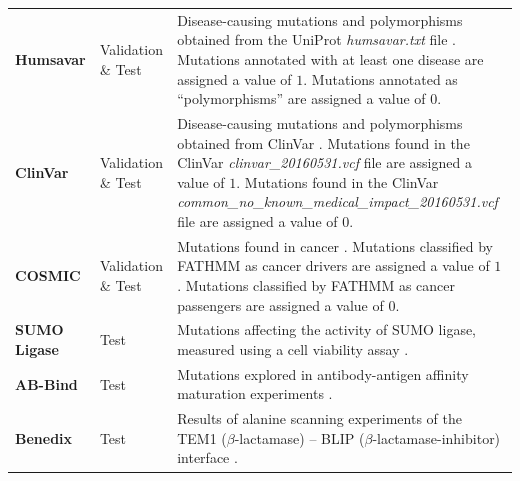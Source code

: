 \begin{table}[tb]
\begin{tabular}{ l |  p{1.8cm} | p{9.4cm} }
		\textbf{Humsavar}     & Validation \& Test & Disease-causing mutations and polymorphisms obtained from the UniProt \textit{humsavar.txt} file \cite{consortium_uniprot:_2015}. Mutations annotated with at least one disease are assigned a value of $1$. Mutations annotated as ``polymorphisms'' are assigned a value of $0$.                                         \\
		\textbf{ClinVar}      & Validation \& Test & Disease-causing mutations and polymorphisms obtained from ClinVar \cite{landrum_clinvar:_2016}. Mutations found in the ClinVar \textit{clinvar\-\_20160531.vcf} file are assigned a value of $1$. Mutations found in the ClinVar \textit{common\-\_no\-\_known\-\_medical\-\_impact\-\_20160531.vcf} file are assigned a value of $0$. \\
		\textbf{COSMIC}       & Validation \& Test & Mutations found in cancer \cite{forbes_cosmic:_2015}. Mutations classified by FATHMM \cite{shihab_ranking_2014} as cancer drivers are assigned a value of $1$. Mutations classified by FATHMM as cancer passengers are assigned a value of $0$.                                                                            \\
		\textbf{SUMO Ligase}  & Test               & Mutations affecting the activity of SUMO ligase, measured using a cell viability assay \cite{cagi4_sumo_ligase}.                                                                                                                                                                                                             \\
		\textbf{AB-Bind}      & Test               & Mutations explored in antibody-antigen affinity maturation experiments \cite{sirin_ab-bind:_2016}.                                                                                                                                                                                                                                   \\
		\textbf{Benedix}      & Test               & Results of alanine scanning experiments of the TEM1 ($\beta$-lactamase) -- BLIP ($\beta$-lactamase-inhibitor) interface \cite{benedix_predicting_2009}.                                                                                                                                                                              \\
		\bottomrule
	\end{tabular}
\end{table}

